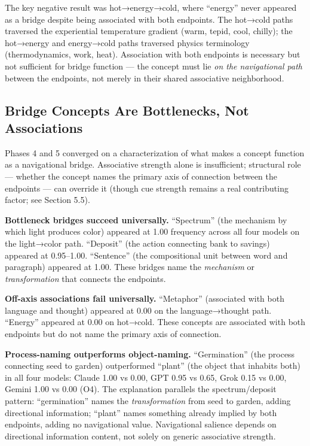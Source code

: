 The key negative result was hot→energy→cold, where ``energy'' never appeared as a bridge despite being associated with both endpoints. The hot→cold paths traversed the experiential temperature gradient (warm, tepid, cool, chilly); the hot→energy and energy→cold paths traversed physics terminology (thermodynamics, work, heat). Association with both endpoints is necessary but not sufficient for bridge function --- the concept must lie \emph{on the navigational path} between the endpoints, not merely in their shared associative neighborhood.

\subsection{Bridge Concepts Are Bottlenecks, Not Associations}\label{bridge-concepts-are-bottlenecks-not-associations}

Phases 4 and 5 converged on a characterization of what makes a concept function as a navigational bridge. Associative strength alone is insufficient; structural role --- whether the concept names the primary axis of connection between the endpoints --- can override it (though cue strength remains a real contributing factor; see Section 5.5).

\textbf{Bottleneck bridges succeed universally.} ``Spectrum'' (the mechanism by which light produces color) appeared at 1.00 frequency across all four models on the light→color path. ``Deposit'' (the action connecting bank to savings) appeared at 0.95--1.00. ``Sentence'' (the compositional unit between word and paragraph) appeared at 1.00. These bridges name the \emph{mechanism} or \emph{transformation} that connects the endpoints.

\textbf{Off-axis associations fail universally.} ``Metaphor'' (associated with both language and thought) appeared at 0.00 on the language→thought path. ``Energy'' appeared at 0.00 on hot→cold. These concepts are associated with both endpoints but do not name the primary axis of connection.

\textbf{Process-naming outperforms object-naming.} ``Germination'' (the process connecting seed to garden) outperformed ``plant'' (the object that inhabits both) in all four models: Claude 1.00 vs 0.00, GPT 0.95 vs 0.65, Grok 0.15 vs 0.00, Gemini 1.00 vs 0.00 (O4). The explanation parallels the spectrum/deposit pattern: ``germination'' names the \emph{transformation} from seed to garden, adding directional information; ``plant'' names something already implied by both endpoints, adding no navigational value. Navigational salience depends on directional information content, not solely on generic associative strength.

